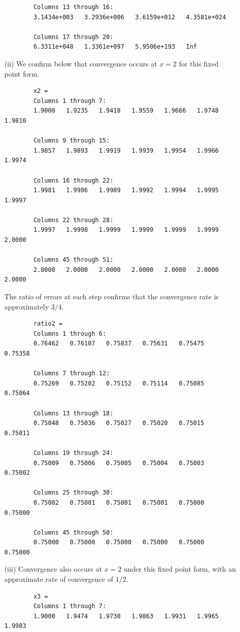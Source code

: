 \documentclass[11pt,a4paper]{article}
\begin{document}
\begin{enumerate}
\begin{enumerate}
\begin{verbatim}
		Columns 13 through 16:
		3.1434e+003   3.2936e+006   3.6159e+012   4.3581e+024 

		Columns 17 through 20:
		6.3311e+048   1.3361e+097   5.9506e+193   Inf
		\end{verbatim}
		
		\pagebreak
		
		\item[(ii)] We confirm below that convergence occurs at $x=2$ for this fixed point form.
		\begin{verbatim}
		x2 =
		Columns 1 through 7:
		1.9000   1.9235   1.9418   1.9559   1.9666   1.9748   1.9810   

		Columns 9 through 15:
		1.9857   1.9893   1.9919   1.9939   1.9954   1.9966   1.9974   

		Columns 16 through 22:
		1.9981   1.9986   1.9989   1.9992   1.9994   1.9995   1.9997   

		Columns 22 through 28:
		1.9997   1.9998   1.9999   1.9999   1.9999   1.9999   2.0000
		
		Columns 45 through 51:
		2.0000   2.0000   2.0000   2.0000   2.0000   2.0000   2.0000
		\end{verbatim}
		The ratio of errors at each step confirms that the convergence rate is approximately $3/4$.
		\begin{verbatim}
		ratio2 =
		Columns 1 through 6:
		0.76462   0.76107   0.75837   0.75631   0.75475   0.75358   

		Columns 7 through 12:
		0.75269   0.75202   0.75152   0.75114   0.75085   0.75064   

		Columns 13 through 18:
		0.75048   0.75036   0.75027   0.75020   0.75015   0.75011

		Columns 19 through 24:
		0.75009   0.75006   0.75005   0.75004   0.75003   0.75002  

		Columns 25 through 30:
		0.75002   0.75001   0.75001   0.75001   0.75000   0.75000 
		
		Columns 45 through 50:
		0.75000   0.75000   0.75000   0.75000   0.75000   0.75000 
		\end{verbatim}
		
		\pagebreak
		
		\item[(iii)] Convergence also occurs at $x=2$ under this fixed point form, with an approximate rate of convergence of $1/2$.
		\begin{verbatim}
		x3 =
		Columns 1 through 7:
		1.9000   1.9474   1.9730   1.9863   1.9931   1.9965   1.9983   


\end{verbatim}
\end{enumerate}
\end{enumerate}
\end{document}

